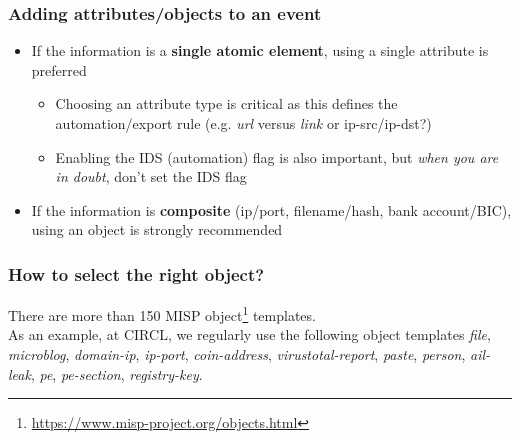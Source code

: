 \begin{frame}
\frametitle{Adding attributes/objects to an event}
\begin{itemize}
        \item If the information is a {\bf single atomic element}, using a single attribute is preferred
                \begin{itemize}
                        \item Choosing an attribute type is critical as this defines the automation/export rule (e.g. {\it url} versus {\it link} or ip-src/ip-dst?)
                        \item Enabling the IDS (automation) flag is also important, but {\it when you are in doubt}, don't set the IDS flag
                \end{itemize}
        \item If the information is {\bf composite} (ip/port, filename/hash, bank account/BIC), using an object is strongly recommended
\end{itemize}
\end{frame}

\begin{frame}
       \frametitle{How to select the right object?}

        There are more than 150 MISP object\footnote{\url{https://www.misp-project.org/objects.html}} templates.\\
      As an example, at CIRCL, we regularly use the following object templates {\it file}, {\it microblog}, {\it domain-ip}, {\it ip-port}, {\it coin-address}, {\it virustotal-report}, {\it paste}, {\it person}, {\it ail-leak}, {\it pe}, {\it pe-section}, {\it registry-key}.\\
\end{frame}

